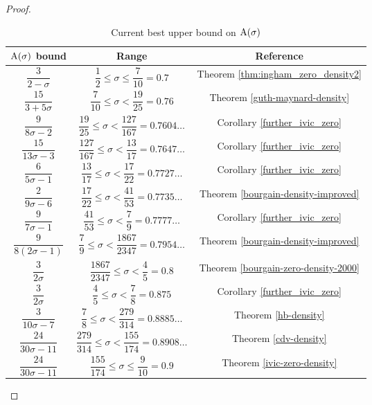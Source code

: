 \begin{proof}
\begin{table}[ht]
    \def\arraystretch{2}
    \centering
    \caption{Current best upper bound on $\mathrm{A}(\sigma)$}
    \begin{tabular}{|c|c|c|}
    \hline
    $\mathrm{A}(\sigma)$ bound & Range & Reference\\
    \hline
    $\dfrac{3}{2 - \sigma}$ & $\dfrac{1}{2} \leq \sigma \le \dfrac{7}{10} = 0.7$ & Theorem \ref{thm:ingham_zero_density2}\\
    \hline
    $\dfrac{15}{3+5\sigma}$ & $\dfrac{7}{10} \leq \sigma < \dfrac{19}{25} = 0.76$ & Theorem \ref{guth-maynard-density}\\
    \hline
    $\dfrac{9}{8\sigma - 2}$ & $\dfrac{19}{25} \leq \sigma < \dfrac{127}{167} = 0.7604\ldots$ & Corollary \ref{further_ivic_zero}\\
    \hline
    $\dfrac{15}{13\sigma - 3}$ & $\dfrac{127}{167} \leq \sigma < \dfrac{13}{17} = 0.7647\ldots$ & Corollary \ref{further_ivic_zero}\\
    \hline
    $\dfrac{6}{5\sigma - 1}$ & $\dfrac{13}{17} \leq \sigma < \dfrac{17}{22} = 0.7727\ldots$ & Corollary \ref{further_ivic_zero}\\
    \hline
    $\dfrac{2}{9\sigma - 6}$ & $\dfrac{17}{22} \leq \sigma < \dfrac{41}{53} = 0.7735\ldots$ & Theorem \ref{bourgain-density-improved}\\
    \hline
    $\dfrac{9}{7\sigma - 1}$ & $\dfrac{41}{53} \leq \sigma < \dfrac{7}{9} = 0.7777\ldots$ & Corollary \ref{further_ivic_zero}\\
    \hline
    $\dfrac{9}{8(2\sigma-1)}$ & $\dfrac{7}{9} \le \sigma < \dfrac{1867}{2347} = 0.7954\ldots$ & Theorem \ref{bourgain-density-improved} \\
    \hline
    $\dfrac{3}{2\sigma}$ & $\dfrac{1867}{2347} \le \sigma < \dfrac{4}{5} = 0.8$ & Theorem \ref{bourgain-zero-density-2000} \\
    \hline
    $\dfrac{3}{2\sigma}$ & $\dfrac{4}{5} \le \sigma < \dfrac{7}{8} = 0.875$ & Corollary \ref{further_ivic_zero} \\
    \hline
    $\dfrac{3}{10\sigma - 7}$ & $\dfrac{7}{8} \le \sigma < \dfrac{279}{314} = 0.8885\ldots$ & Theorem \ref{hb-density}\\
    \hline
    $\dfrac{24}{30\sigma - 11}$ & $\dfrac{279}{314} \le \sigma < \dfrac{155}{174} = 0.8908\ldots$ & Theorem \ref{cdv-density}  \\
    \hline
    $\dfrac{24}{30\sigma - 11}$& $\dfrac{155}{174} \le \sigma \le \dfrac{9}{10} = 0.9$ & Theorem \ref{ivic-zero-density}\\

\end{tabular}
\end{table}
\end{proof}
